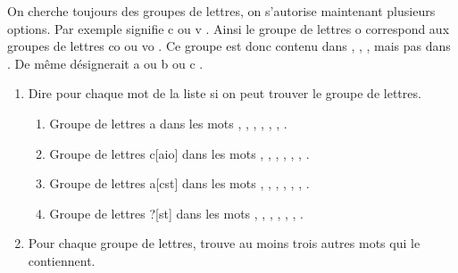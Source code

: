 \documentclass[class=report,crop=false, 12pt]{standalone}
\begin{document}
\begin{activite}

On cherche toujours des groupes de lettres, on s'autorise maintenant plusieurs options. Par exemple \og [cv] \fg{} signifie \og c \fg{} ou \og v \fg{}. Ainsi le groupe de lettres \og [cv]o \fg{} correspond aux groupes de lettres \og co \fg{} ou \og vo \fg{}. Ce groupe est donc contenu dans , , , mais pas dans . De même \og [abc] \fg{} désignerait \og a \fg{} ou \og b \fg{} ou \og c \fg{}.

\begin{enumerate}
  \item Dire pour chaque mot de la liste si on peut trouver le groupe de lettres.
  \begin{enumerate}
    \item Groupe de lettres \og [lp]a \fg{} dans les mots , , , , , , .
    \item Groupe de lettres \og c[aio] \fg{} dans les mots , , , , , , .
    \item Groupe de lettres \og [lt]a[cst] \fg{} dans les mots , , , , , , .    
    \item Groupe de lettres \og [cp]\!?[st] \fg{} dans les mots , , , , , , .
  \end{enumerate}
  
  
  \item Pour chaque groupe de lettres, trouve au moins trois autres mots qui le contiennent.
\end{enumerate}

\end{activite}
\end{document}
